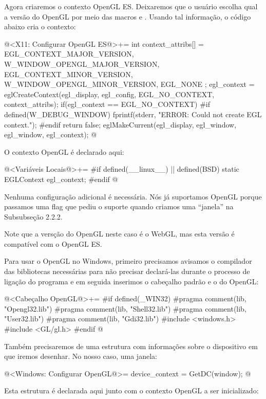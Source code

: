 Agora criaremos o contexto OpenGL ES. Deixaremos que o usuário escolha
qual a versão do OpenGL por meio das
macros  e
. Usando tal informação, o código abaixo cria o contexto:

\iniciocodigo
@<X11: Configurar OpenGL ES@>+=
{
  int context_attribs[] = {
    EGL_CONTEXT_MAJOR_VERSION, W_WINDOW_OPENGL_MAJOR_VERSION,
    EGL_CONTEXT_MINOR_VERSION, W_WINDOW_OPENGL_MINOR_VERSION,
    EGL_NONE
  };
  egl_context = eglCreateContext(egl_display, egl_config,
                                 EGL_NO_CONTEXT, context_attribs);
  if(egl_context == EGL_NO_CONTEXT){
#if defined(W_DEBUG_WINDOW)
    fprintf(stderr, "ERROR: Could not create EGL context.\n");
#endif
    return false;
  }
  eglMakeCurrent(egl_display, egl_window, egl_window, egl_context);
}
@
\fimcodigo

O contexto OpenGL é declarado aqui:

\iniciocodigo
@<Variáveis Locais@>+=
#if defined(__linux__) || defined(BSD)
static EGLContext egl_context;
#endif
@
\fimcodigo


Nenhuma configuração adicional é necessária. Nós já suportamos OpenGL
porque passamos uma flag que pediu o suporte quando criamos uma
``janela'' na Subsubseção 2.2.2.

Note que a versção do OpenGL neste caso é o WebGL, mas esta versão é
compatível com o OpenGL ES.


Para usar o OpenGL no Windows, primeiro precisamos avisamos o
compilador das bibliotecas necessárias para não precisar declará-las
durante o processo de ligação do programa e em seguida inserimos o
cabeçalho padrão e o do OpenGL:

\iniciocodigo
@<Cabeçalho OpenGL@>+=
#if defined(_WIN32)
#pragma comment(lib, "Opengl32.lib")
#pragma comment(lib, "Shell32.lib")
#pragma comment(lib, "User32.lib")
#pragma comment(lib, "Gdi32.lib")
#include <windows.h>
#include <GL/gl.h>
#endif
@
\fimcodigo

Também precisaremos de uma estrutura com informações sobre o
dispositivo em que iremos desenhar. No nosso caso, uma janela:

\iniciocodigo
@<Windows: Configurar OpenGL@>=
device_context = GetDC(window);
@
\fimcodigo

Esta estrutura é declarada aqui junto com o contexto OpenGL a ser
inicializado:

